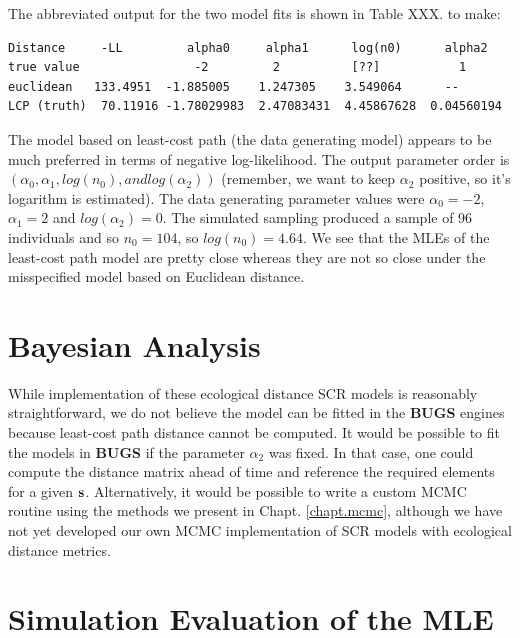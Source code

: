 The abbreviated output for the two model fits is shown in Table XXX.
 to make:
\begin{verbatim}
Distance     -LL         alpha0     alpha1      log(n0)      alpha2
true value                -2         2          [??]           1
euclidean   133.4951  -1.885005    1.247305    3.549064      --
LCP (truth)  70.11916 -1.78029983  2.47083431  4.45867628  0.04560194
\end{verbatim}



The model based on least-cost path (the data generating model) appears
to be much preferred in terms of negative log-likelihood.
The output parameter order is $(\alpha_{0}, \alpha_{1}, log(n_{0}), and
log(\alpha_{2}))$ (remember, we want to keep $\alpha_{2}$
positive, so it's logarithm is estimated). 
The data generating parameter values were
$\alpha_{0} = - 2$, 
$\alpha_{1} = 2$ and $log(\alpha_{2}) = 0$.
The simulated sampling produced a sample of 96 individuals and so
$n_{0} = 104$, so $log(n_{0}) = 4.64$. We see that the 
 MLEs of the least-cost path model are pretty close whereas they are
 not so close under the misspecified model based on Euclidean distance.






\section{Bayesian Analysis}

While implementation of these ecological distance SCR models is
reasonably straightforward, we do not believe the model can be fitted
in the  {\bf BUGS} engines because least-cost path distance cannot be computed.
It would be possible to fit the models
in {\bf BUGS} if the parameter $\alpha_{2}$ was fixed. In that case,
one could compute the distance matrix ahead of time and reference the
required elements for a given ${\bf s}$.
Alternatively, it would be possible to write a custom MCMC routine
using the methods we present in Chapt. \ref{chapt.mcmc}, although we
have not yet developed our own MCMC implementation of SCR models with
ecological distance metrics. 


\section{Simulation Evaluation of the MLE}

